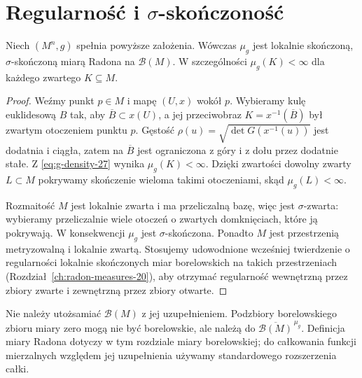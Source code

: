 \section{Regularność i $\sigma$-skończoność}
\begin{twierdzenie}
\label{thm:riemann-radon-27}
Niech $(M^n,g)$ spełnia powyższe założenia. Wówczas
$\mu_g$ jest lokalnie skończoną, $\sigma$-skończoną
miarą Radona na $\mathcal B(M)$. W szczególności
$\mu_g(K)<\infty$ dla każdego zwartego $K\subseteq M$.
\end{twierdzenie}
\begin{proof}
Weźmy punkt $p\in M$ i mapę $(U,x)$ wokół $p$.
Wybieramy kulę euklidesową $B$ tak, aby
$\overline B\subset x(U)$, a jej przeciwobraz $K=x^{-1}(\overline B)$
był zwartym otoczeniem punktu $p$. Gęstość
$\rho(u)=\sqrt{\det G(x^{-1}(u))}$ jest dodatnia
i ciągła, zatem na $\overline B$ jest ograniczona
z góry i z dołu przez dodatnie stałe. Z
\eqref{eq:g-density-27} wynika $\mu_g(K)<\infty$.
Dzięki zwartości dowolny zwarty $L\subset M$ pokrywamy
skończenie wieloma takimi otoczeniami, skąd
$\mu_g(L)<\infty$.

Rozmaitość $M$ jest lokalnie zwarta i ma przeliczalną
bazę, więc jest $\sigma$-zwarta: wybieramy
przeliczalnie wiele otoczeń o zwartych domknięciach,
które ją pokrywają. W konsekwencji $\mu_g$ jest
$\sigma$-skończona. Ponadto $M$ jest przestrzenią
metryzowalną i lokalnie zwartą. Stosujemy
udowodnione wcześniej twierdzenie o regularności
lokalnie skończonych miar borelowskich na takich
przestrzeniach (Rozdział~\ref{ch:radon-measures-20}),
aby otrzymać regularność wewnętrzną przez zbiory
zwarte i zewnętrzną przez zbiory otwarte.
\end{proof}

\begin{uwaga}
Nie należy utożsamiać $\mathcal B(M)$ z jej
uzupełnieniem. Podzbiory borelowskiego zbioru
miary zero mogą nie być borelowskie, ale należą do
$\overline{\mathcal B(M)}^{\,\mu_g}$.
Definicja miary Radona dotyczy w tym rozdziale
miary borelowskiej; do całkowania funkcji
mierzalnych względem jej uzupełnienia używamy
standardowego rozszerzenia całki.
\end{uwaga}


